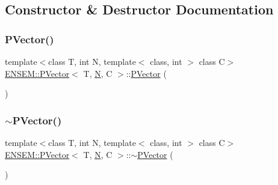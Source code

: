 \subsection{Constructor \& Destructor Documentation}
\mbox{\label{classENSEM_1_1PVector_afc5f971e6ec88789c8205b2e03b1edfd}} 
\subsubsection{\texorpdfstring{PVector()}{PVector()}\hspace{0.1cm}{\footnotesize\ttfamily [1/2]}}
{\footnotesize\ttfamily template$<$class T, int N, template$<$ class, int $>$ class C$>$ \\
\mbox{\hyperlink{classENSEM_1_1PVector}{E\+N\+S\+E\+M\+::\+P\+Vector}}$<$ T, \mbox{\hyperlink{operator__name__util_8cc_a7722c8ecbb62d99aee7ce68b1752f337}{N}}, C $>$\+::\mbox{\hyperlink{classENSEM_1_1PVector}{P\+Vector}} (\begin{DoxyParamCaption}{ }\end{DoxyParamCaption})\hspace{0.3cm}{\ttfamily [inline]}}

\mbox{\label{classENSEM_1_1PVector_a74ba2f55760e8ed1947ef3bb534400b6}} 
\subsubsection{\texorpdfstring{$\sim$PVector()}{~PVector()}\hspace{0.1cm}{\footnotesize\ttfamily [1/2]}}
{\footnotesize\ttfamily template$<$class T, int N, template$<$ class, int $>$ class C$>$ \\
\mbox{\hyperlink{classENSEM_1_1PVector}{E\+N\+S\+E\+M\+::\+P\+Vector}}$<$ T, \mbox{\hyperlink{operator__name__util_8cc_a7722c8ecbb62d99aee7ce68b1752f337}{N}}, C $>$\+::$\sim$\mbox{\hyperlink{classENSEM_1_1PVector}{P\+Vector}} (\begin{DoxyParamCaption}{ }\end{DoxyParamCaption})\hspace{0.3cm}{\ttfamily [inline]}}

